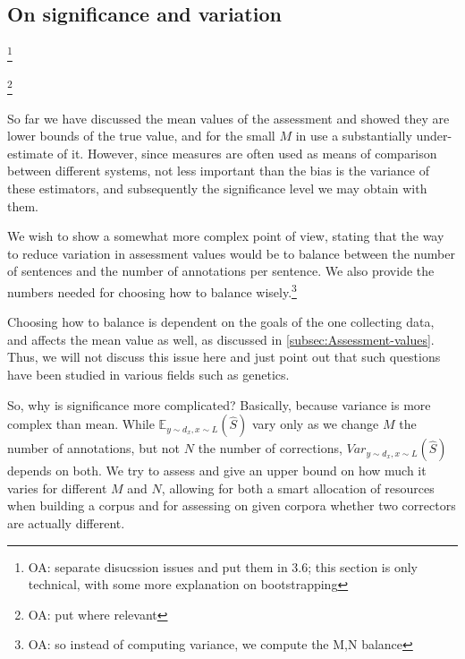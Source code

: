\documentclass[letter,11pt]{article}
\newcommand{\oa}[1]{\footnote{\color{red}OA: #1}}
\begin{document}
 
\subsection{On significance and variation}

\oa{separate disucssion issues and put them in 3.6; this section is only
  technical, with some more explanation on bootstrapping}

\cite{yeh2000more}\oa{put where relevant}


So far we have discussed the mean values of the assessment and showed they are lower bounds of the true value, and for the small $M$ in use a substantially under-estimate of it. However, since measures are often used as means of comparison between different systems, not less important than the bias is the variance of these estimators, and subsequently the significance level we may obtain with them.

We wish to show a somewhat more complex point of view, stating that the way to reduce variation in assessment values would be to balance between the number of sentences and the number of annotations per sentence. We also provide the numbers needed for choosing how to balance wisely.\oa{so instead of computing variance, we compute the M,N balance} 

Choosing how to balance is dependent on the goals of the one collecting data, and affects the mean value as well, as discussed in \ref{subsec:Assessment-values}. Thus, we will not discuss this issue here and just point out that such questions have been studied in various fields such as genetics\cite{ionita2010optimal}.

So, why is significance more complicated? Basically, because variance is more complex than mean. While $\mathbb{E}_{y\sim d_x, x\sim L}\left(\hat{S}\right)$ vary only as we change $M$
the number of annotations, but not $N$ the number of corrections,
$Var_{y\sim d_x, x\sim L}(\hat{S})$ depends on both. We try to assess and give an upper
bound on how much it varies for different $M$ and $N$, allowing
for both a smart allocation of resources when building a corpus and for assessing on given corpora whether two correctors are actually different.

\begin{figure}
   	\texttt{[image: \$F\_\{0.5]}$_Ms_significance}
	\caption{F Score results with different sizes of gold standard.\label{fig:F_Ms}}
\end{figure}
\begin{figure}
   	\texttt{[image: \$F\_\{0.5]}$_significance}
	\caption{F Score results for different correctors including confidence interval.\label{fig:F_correctors}}
\end{figure}
\end{document}
